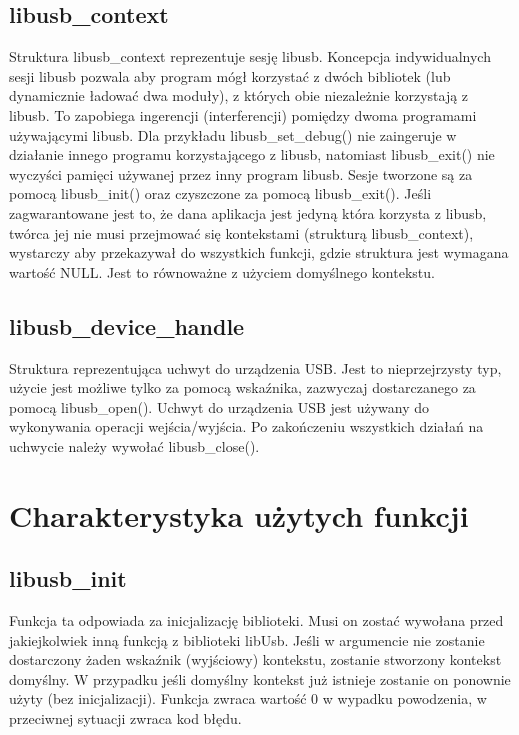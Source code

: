\documentclass{BscUS}
\begin{document}
\subsection{libusb\_context}
\noindent Struktura libusb\_context reprezentuje sesję libusb.
Koncepcja indywidualnych sesji libusb pozwala aby program mógł korzystać z dwóch bibliotek (lub dynamicznie ładować dwa moduły), z których obie niezależnie korzystają z libusb. To zapobiega ingerencji (interferencji) pomiędzy dwoma programami używającymi libusb. Dla przykładu libusb\_set\_debug() nie zaingeruje w działanie innego programu korzystającego z libusb, natomiast libusb\_exit() nie wyczyści pamięci używanej przez inny program libusb.
Sesje tworzone są za pomocą libusb\_init() oraz czyszczone za pomocą libusb\_exit(). Jeśli zagwarantowane jest to, że dana aplikacja jest jedyną która korzysta z libusb, twórca jej nie musi przejmować się kontekstami (strukturą libusb\_context), wystarczy aby przekazywał do wszystkich funkcji, gdzie struktura jest wymagana wartość NULL. Jest to równoważne z użyciem domyślnego kontekstu.
\subsection{libusb\_device\_handle}
\noindent Struktura reprezentująca uchwyt do urządzenia USB.
Jest to nieprzejrzysty typ, użycie jest możliwe tylko za pomocą wskaźnika, zazwyczaj dostarczanego za pomocą libusb\_open().
Uchwyt do urządzenia USB jest używany do wykonywania operacji wejścia/wyjścia. Po zakończeniu wszystkich działań na uchwycie należy wywołać libusb\_close().

\section{Charakterystyka użytych funkcji}
\subsection{libusb\_init}
\noindent Funkcja ta odpowiada za inicjalizację biblioteki.
Musi on zostać wywołana przed jakiejkolwiek inną funkcją z biblioteki libUsb.
Jeśli w argumencie nie zostanie dostarczony żaden wskaźnik (wyjściowy) kontekstu, zostanie stworzony kontekst domyślny. W przypadku jeśli domyślny kontekst już istnieje zostanie on ponownie użyty (bez inicjalizacji).
Funkcja zwraca wartość 0 w wypadku powodzenia, w przeciwnej sytuacji zwraca kod błędu.
\end{document}
